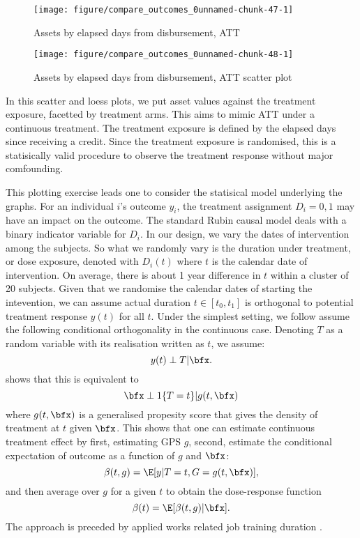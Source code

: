 \begin{Schunk}
\begin{figure}

{\centering \texttt{[image: figure/compare\_outcomes\_0unnamed-chunk-47-1]} 

}

\caption[Assets by elapsed days from disbursement, ATT]{Assets by elapsed days from disbursement, ATT}\label{Figureunnamed-chunk-47}
\end{figure}
\end{Schunk}

\begin{Schunk}
\begin{figure}

{\centering \texttt{[image: figure/compare\_outcomes\_0unnamed-chunk-48-1]} 

}

\caption[Assets by elapsed days from disbursement, ATT scatter plot]{Assets by elapsed days from disbursement, ATT scatter plot}\label{Figureunnamed-chunk-48}
\end{figure}
\end{Schunk}
In this scatter and loess plots, we put asset values against the treatment exposure, facetted by treatment arms. This aims to mimic ATT under a continuous treatment. The treatment exposure is defined by the elapsed days since receiving a credit. Since the treatment exposure is randomised, this is a statisically valid procedure to observe the treatment response without major comfounding.

This plotting exercise leads one to consider the statisical model underlying the graphs. For an individual $i$'s outcome $y_{i}$, the treatment assignment $D_{i}=0,1$ may have an impact on the outcome. The standard Rubin causal model deals with a binary indicator variable for $D_{i}$. In our design, we vary the dates of intervention among the subjects. So what we randomly vary is the duration under treatment, or dose exposure, denoted with $D_{i}(t)$ where $t$ is the calendar date of intervention. On average, there is about 1 year difference in $t$ within a cluster of 20 subjects. Given that we randomise the calendar dates of starting the intevention, we can assume actual duration $t\in[t_{0}, t_{1}]$ is orthogonal to potential treatment response $y(t)$ for all $t$. Under the simplest setting, we follow \citet{Imbens2000, HiranoImbens2004, ImaiVanDyk2004, Egger2013} assume the following conditional orthogonality in the continuous case. Denoting $T$ as a random variable with its realisation written as $t$, we assume:
\[
y(t)\perp T|\bfx.
\]
\citet{HiranoImbens2004} shows that this is equivalent to
\[
\bfx\perp 1\{T=t\}|g(t,\bfx)
\]
where $g(t,\bfx)$ is a generalised propesity score that gives the density of treatment at $t$ given $\bfx$. This shows that one can estimate continuous treatment effect by first, estimating GPS $g$, second, estimate the conditional expectation of outcome as a function of $g$ and $\bfx$:
\[
\beta(t, g)=\E[y|T=t, G=g(t,\bfx)],
\]
and then average over $g$ for a given $t$ to obtain the dose-response function
\[
\beta(t)=\E[\beta(t, g)|\bfx].
\]
The approach is preceded by applied works related job training duration \citep{Kluveetal2012}. 

